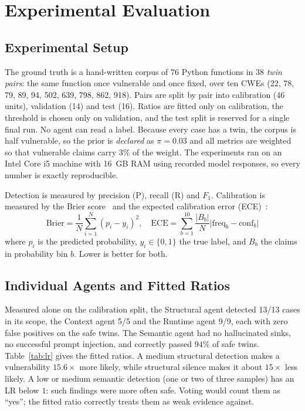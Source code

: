 \documentclass[conference]{IEEEtran}
\begin{document}
\section{Experimental Evaluation} \label{IMP}

\subsection{Experimental Setup}
The ground truth is a hand-written corpus of 76 Python functions in 38
\emph{twin pairs}: the same function once vulnerable and once fixed, over
ten CWEs (22, 78, 79, 89, 94, 502, 639, 798, 862, 918). Pairs are split by
pair into calibration (46 units), validation (14) and test (16). Ratios
are fitted only on calibration, the threshold is chosen only on
validation, and the test split is reserved for a single final run. No
agent can read a label. Because every case has a twin, the corpus is half
vulnerable, so the prior is \emph{declared} as $\pi=0.03$ and all metrics
are weighted so that vulnerable claims carry $3\%$ of the weight. The
experiments ran on an Intel Core i5 machine with 16~GB RAM using recorded
model responses, so every number is exactly reproducible.

Detection is measured by precision (P), recall (R) and $F_1$. Calibration
is measured by the Brier score~\cite{brier1950} and the expected
calibration error (ECE)~\cite{guo2017calibration}:
\begin{equation}
\mathrm{Brier}=\frac{1}{N}\sum_{i=1}^{N}(p_i-y_i)^2,\quad
\mathrm{ECE}=\sum_{b=1}^{10}\frac{|B_b|}{N}\bigl|\mathrm{freq}_b-\mathrm{conf}_b\bigr|
\label{eq:metrics}
\end{equation}
where $p_i$ is the predicted probability, $y_i\in\{0,1\}$ the true label,
and $B_b$ the claims in probability bin $b$. Lower is better for both.

\subsection{Individual Agents and Fitted Ratios}
Measured alone on the calibration split, the Structural agent detected
13/13 cases in its scope, the Context agent 5/5 and the Runtime agent 9/9,
each with zero false positives on the safe twins. The Semantic agent had
no hallucinated sinks, no successful prompt injection, and correctly
passed $94\%$ of safe twins. Table~\ref{tab:lr} gives the fitted ratios.
A medium structural detection makes a vulnerability $15.6\times$ more
likely, while structural silence makes it about $15\times$ less likely. A
low or medium semantic detection (one or two of three samples) has an LR
below $1$: such findings were more often safe. Voting would count them as
``yes''; the fitted ratio correctly treats them as weak evidence against.
\end{document}
